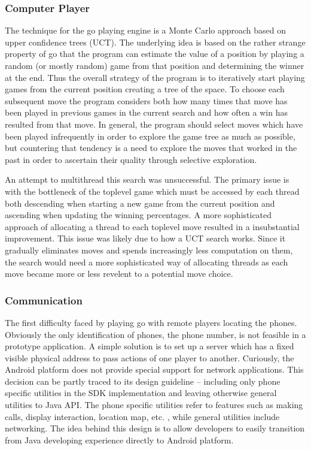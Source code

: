 \documentclass[acmtocl]{acmtrans2m}
\begin{document}
\subsubsection{Computer Player}

The technique for the go playing engine is a Monte Carlo approach based on upper confidence trees (UCT).  The underlying idea is based on the rather strange property of go that the program can estimate the value of a position by playing a random (or mostly random) game from that position and determining the winner at the end.  Thus the overall strategy of the program is to iteratively start playing games from the current position creating a tree of the space.  To choose each subsequent move the program considers both how many times that move has been played in previous games in the current search and how often a win has resulted from that move.  In general, the program should select moves which have been played infrequently in order to explore the game tree as much as possible, but countering that tendency is a need to explore the moves that worked in the past in order to ascertain their quality through selective exploration. 

An attempt to multithread this search was unsuccessful. The primary issue is with the bottleneck of the toplevel game which must be accessed by each thread both descending when starting a new game from the current position and ascending when updating the winning percentages.  A more sophisticated approach of allocating a thread to each toplevel move resulted in a insubstantial improvement.  This issue was likely due to how a UCT search works.  Since it gradually eliminates moves and spends increasingly less computation on them, the search would need a more sophisticated way of allocating threads as each move became more or less revelent to a potential move choice.  

\subsubsection{Communication}
The first difficulty faced by playing go with remote players locating the phones. Obviously the only identification of phones, the phone number, is not feasible in a prototype application. A simple solution is to set up a server which has a fixed visible physical address to pass actions of one player to another.  Curiously, the Android platform does not provide special support for network applications. This decision can be partly traced to its design guideline – including only phone specific utilities in the SDK implementation and leaving otherwise general utilities to Java API.  The phone specific utilities refer to features such as making calls, display interaction, location map, etc. , while general utilities include networking.  The idea behind this design is to allow developers to easily transition from Java developing experience directly to Android platform.
\end{document}
